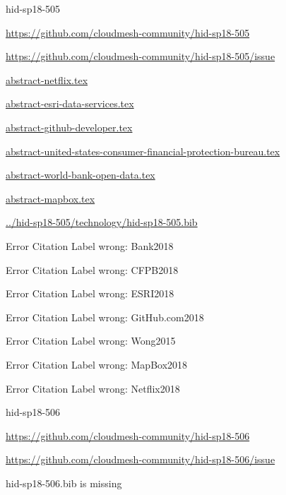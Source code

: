 \begin{IU}

hid-sp18-505

\url{https://github.com/cloudmesh-community/hid-sp18-505}

\url{https://github.com/cloudmesh-community/hid-sp18-505/issue}

\href{https://github.com/cloudmesh-community/hid-sp18-505/blob/master//technology/abstract-netflix.tex}{abstract-netflix.tex}

\href{https://github.com/cloudmesh-community/hid-sp18-505/blob/master//technology/abstract-esri-data-services.tex}{abstract-esri-data-services.tex}

\href{https://github.com/cloudmesh-community/hid-sp18-505/blob/master//technology/abstract-github-developer.tex}{abstract-github-developer.tex}

\href{https://github.com/cloudmesh-community/hid-sp18-505/blob/master//technology/abstract-united-states-consumer-financial-protection-bureau.tex}{abstract-united-states-consumer-financial-protection-bureau.tex}

\href{https://github.com/cloudmesh-community/hid-sp18-505/blob/master//technology/abstract-world-bank-open-data.tex}{abstract-world-bank-open-data.tex}

\href{https://github.com/cloudmesh-community/hid-sp18-505/blob/master//technology/abstract-mapbox.tex}{abstract-mapbox.tex}

\href{https://github.com/cloudmesh-community/hid-sp18-505/blob/master//technology/hid-sp18-505.bib}{../hid-sp18-505/technology/hid-sp18-505.bib}

 Error Citation Label wrong: Bank2018

 Error Citation Label wrong: CFPB2018

 Error Citation Label wrong: ESRI2018

 Error Citation Label wrong: GitHub.com2018

 Error Citation Label wrong: Wong2015

 Error Citation Label wrong: MapBox2018

 Error Citation Label wrong: Netflix2018

\end{IU}


\begin{IU}

hid-sp18-506

\url{https://github.com/cloudmesh-community/hid-sp18-506}

\url{https://github.com/cloudmesh-community/hid-sp18-506/issue}

hid-sp18-506.bib is missing

\end{IU}



